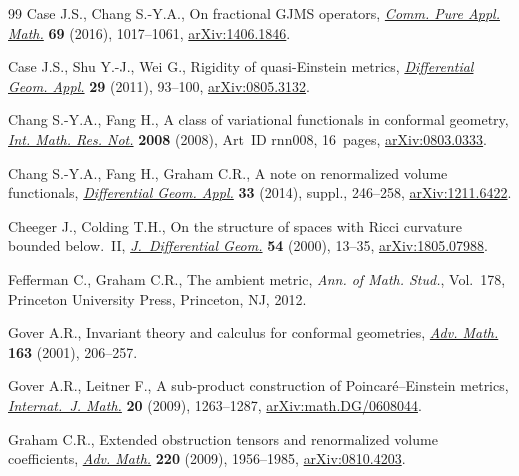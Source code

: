 \documentclass[10pt,a4paper]{amsart}
\numberwithin{equation}{section}
\begin{document}
\begin{thebibliography}{99}
Case J.S., Chang S.-Y.A., On fractional {GJMS} operators, \href{https://doi.org/10.1002/cpa.21564}{\textit{Comm. Pure
 Appl. Math.}} \textbf{69} (2016), 1017--1061, \href{https://arxiv.org/abs/1406.1846}{arXiv:1406.1846}.

Case J.S., Shu Y.-J., Wei G., Rigidity of quasi-{E}instein metrics,
 \href{https://doi.org/10.1016/j.difgeo.2010.11.003}{\textit{Differential Geom. Appl.}} \textbf{29} (2011), 93--100,
 \href{https://arxiv.org/abs/0805.3132}{arXiv:0805.3132}.

Chang S.-Y.A., Fang H., A class of variational functionals in conformal
 geometry, \href{https://doi.org/10.1093/imrn/rnn008}{\textit{Int. Math. Res. Not.}} \textbf{2008} (2008), Art~ID rnn008,
 16~pages, \href{https://arxiv.org/abs/0803.0333}{arXiv:0803.0333}.

Chang S.-Y.A., Fang H., Graham C.R., A note on renormalized volume functionals,
 \href{https://doi.org/10.1016/j.difgeo.2013.10.001}{\textit{Differential Geom. Appl.}} \textbf{33} (2014), suppl., 246--258,
 \href{https://arxiv.org/abs/1211.6422}{arXiv:1211.6422}.

Cheeger J., Colding T.H., On the structure of spaces with {R}icci curvature
 bounded below.~{II}, \href{https://doi.org/10.4310/jdg/1214342145}{\textit{J.~Differential Geom.}} \textbf{54} (2000),
 13--35, \href{https://arxiv.org/abs/1805.07988}{arXiv:1805.07988}.

Fefferman C., Graham C.R., The ambient metric, \textit{Ann. of Math. Stud.},
 Vol.~178, Princeton University Press, Princeton, NJ, 2012.

Gover A.R., Invariant theory and calculus for conformal geometries,
 \href{https://doi.org/10.1006/aima.2001.1999}{\textit{Adv. Math.}} \textbf{163} (2001), 206--257.

Gover A.R., Leitner F., A sub-product construction of {P}oincar\'e--{E}instein
 metrics, \href{https://doi.org/10.1142/S0129167X09005753}{\textit{Internat.~J. Math.}} \textbf{20} (2009), 1263--1287,
 \href{https://arxiv.org/abs/math.DG/0608044}{arXiv:math.DG/0608044}.

Graham C.R., Extended obstruction tensors and renormalized volume coefficients,
 \href{https://doi.org/10.1016/j.aim.2008.11.015}{\textit{Adv. Math.}} \textbf{220} (2009), 1956--1985, \href{https://arxiv.org/abs/0810.4203}{arXiv:0810.4203}.


\end{thebibliography}
\end{document}
